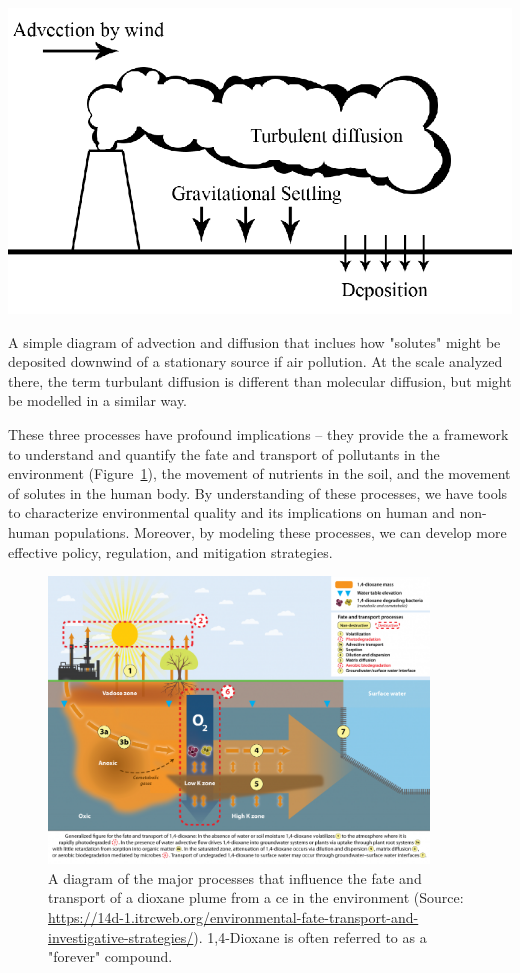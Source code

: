 \documentclass{tufte-handout}\usepackage[]{graphicx}\usepackage[]{xcolor}
\begin{document}
\begin{marginfigure}
\centering
\includegraphics[width=1.0\textwidth]{graphics/Diagram-advection-diffusion.png}
\caption{A simple diagram of advection and diffusion that inclues how "solutes" might be deposited downwind of a stationary source if air pollution. At the scale analyzed there, the term turbulant diffusion is different than molecular diffusion, but might be modelled in a similar way.}
\label{fig:advection-diffusion}
\end{marginfigure}


These three processes have profound  implications -- they provide the a framework to understand and quantify the fate and transport of pollutants in the environment (Figure~\ref{fig:dioxaneplume}), the movement of nutrients in the soil, and the movement of solutes in the human body. By understanding of these processes, we have tools to characterize environmental quality and its implications on human and non-human populations. Moreover, by modeling these processes, we can develop more effective policy, regulation, and mitigation strategies.

\begin{figure}
\centering
\includegraphics[width=0.9\textwidth]{graphics/Dioxane_plume.png}
\caption{A diagram of the major processes that influence the fate and transport of a dioxane plume from a ce in the environment (Source: \url{https://14d-1.itrcweb.org/environmental-fate-transport-and-investigative-strategies/}). 1,4-Dioxane is often referred to as a "forever" compound.}
\label{fig:dioxaneplume}
\end{figure}
\end{document}
